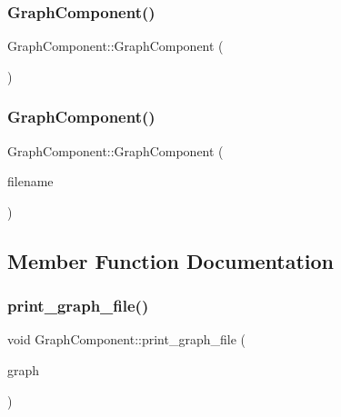 \subsubsection{\texorpdfstring{Graph\+Component()}{GraphComponent()}\hspace{0.1cm}{\footnotesize\ttfamily [1/2]}}
{\footnotesize\ttfamily Graph\+Component\+::\+Graph\+Component (\begin{DoxyParamCaption}{ }\end{DoxyParamCaption})}

\mbox{\label{class_graph_component_a14482fdab4e309677b4a14ab8db13079_a14482fdab4e309677b4a14ab8db13079}} 
\subsubsection{\texorpdfstring{Graph\+Component()}{GraphComponent()}\hspace{0.1cm}{\footnotesize\ttfamily [2/2]}}
{\footnotesize\ttfamily Graph\+Component\+::\+Graph\+Component (\begin{DoxyParamCaption}\item[{std\+::string}]{filename }\end{DoxyParamCaption})\hspace{0.3cm}{\ttfamily [inline]}}



\subsection{Member Function Documentation}
\mbox{\label{class_graph_component_a6af293dac3774fde0e2822b5725ecacd_a6af293dac3774fde0e2822b5725ecacd}} 
\subsubsection{\texorpdfstring{print\+\_\+graph\+\_\+file()}{print\_graph\_file()}}
{\footnotesize\ttfamily void Graph\+Component\+::print\+\_\+graph\+\_\+file (\begin{DoxyParamCaption}\item[{\hyperlink{class_graph_component_a982e0748a6e1b8dc74986f5f8b3dca5c_a982e0748a6e1b8dc74986f5f8b3dca5c}{the\+Graph} \&}]{graph }\end{DoxyParamCaption})}


